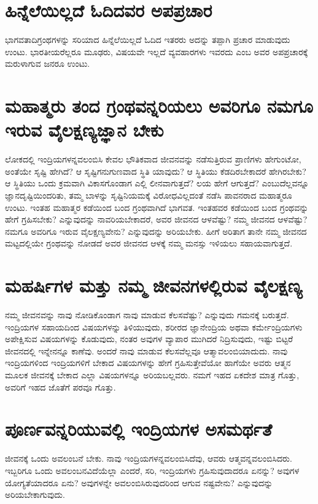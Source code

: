 \section*{ಹಿನ್ನೆಲೆಯಿಲ್ಲದೆ ಓದಿದವರ ಅಪಪ್ರಚಾರ}

ಭಾಗವತಾದಿಗ್ರಂಥಗಳನ್ನು ಸರಿಯಾದ ಹಿನ್ನೆಲೆಯಿಲ್ಲದೆ ಓದಿದ ಇತರರು ಅದನ್ನು ತಪ್ಪಾಗಿ ಪ್ರಚಾರ ಮಾಡುವುದು ಉಂಟು. ಭಾರತೀಯರೆಲ್ಲರೂ ಮೂಢರು, ವಿಷಯವೇ ಇಲ್ಲದೆ ವ್ಯವಹಾರಗಳು ಇವರದು ಎಂಬ ಅವರ ಅಪಪ್ರಚಾರಕ್ಕೆ ಮರುಳಾಗುವ ಜನರೂ ಉಂಟು.

\section*{ಮಹಾತ್ಮರು ತಂದ ಗ್ರಂಥವನ್ನರಿಯಲು ಅವರಿಗೂ ನಮಗೂ ಇರುವ ವೈಲಕ್ಷಣ್ಯಜ್ಞಾನ ಬೇಕು}

ಲೋಕದಲ್ಲಿ ಇಂದ್ರಿಯಗಳನ್ನವಲಂಬಿಸಿ ಕೇವಲ ಭೌತಿಕವಾದ ಜೀವನವನ್ನು ನಡೆಸುತ್ತಿರುವ ಪ್ರಾಣಿಗಳು ಹೇಗುಂಟೋ, ಅಂತೆಯೇ ಸೃಷ್ಟಿ ಹೇಗಿದೆ? ಆ ಸೃಷ್ಟಿಗನುಗುಣವಾದ ಸ್ಥಿತಿ ಯಾವುದು? ಆ ಸ್ಥಿತಿಯು ಕೆಡದಿರಬೇಕಾದರೆ ಹೇಗಿರಬೇಕು? ಆ ಸ್ಥಿತಿಯು ಒಂದು ಕ್ರಮವಾಗಿ ವಿಕಾಸಗೊಂಡಾಗ ಎಲ್ಲಿ ಲೀನವಾಗುತ್ತದೆ? ಲಯ ಹೇಗೆ ಆಗುತ್ತದೆ? ಎಂಬುದೆಲ್ಲವನ್ನೂ ಜ್ಞಾನದೃಷ್ಟಿಯಿಂದರಿತು, ತಮ್ಮ ಬಾಳನ್ನು ಸೃಷ್ಟಿನಿಯಮಕ್ಕೆ ವಿರೋಧವಿಲ್ಲದಂತೆ ನಡೆಸಿ ಪಾವನರಾದ ಮಹಾತ್ಮರೂ ಉಂಟು. ಇಂತಹ ಮಹಾತ್ಮರ ಕಡೆಯಿಂದ ಬಂದ ಗ್ರಂಥವಾಗಿದೆ ಭಾಗವತ. ಇಂತಹವರ ಕಡೆಯಿಂದ ಬಂದ ಗ್ರಂಥವನ್ನು ಹೇಗೆ ಗ್ರಹಿಸಬೇಕು? ಎನ್ನುವುದನ್ನು ನಾವರಿಯಬೇಕಾದರೆ, ಅವರ ಜೀವನದ ಆಳವೆಷ್ಟು? ನಮ್ಮ ಜೀವನದ ಆಳವೆಷ್ಟು? ನಮಗೂ ಅವರಿಗೂ ಇರುವ ವೈಲಕ್ಷಣ್ಯವೇನು? ಎನ್ನುವುದನ್ನು ಅರಿಯಬೇಕು. ಹೀಗೆ ಅರಿತಾಗ ತಾನೇ ನಮ್ಮ ಜೀವನದ ಮಟ್ಟದಲ್ಲಿಯೇ ಗ್ರಂಥವನ್ನು ನೋಡದೆ ಅವರ ಜೀವನದ ಆಳಕ್ಕೆ ನಮ್ಮ ಮನಸ್ಸು ಇಳಿಯಲು ಸಹಾಯವಾಗುತ್ತದೆ. 

\section*{ಮಹರ್ಷಿಗಳ ಮತ್ತು ನಮ್ಮ ಜೀವನಗಳಲ್ಲಿರುವ ವೈಲಕ್ಷಣ್ಯ }

ನಮ್ಮ ಜೀವನವನ್ನು ನಾವು ನೋಡಿಕೊಂಡಾಗ ನಾವು ಮಾಡುವ ಕೆಲಸವೆಷ್ಟು? ಎನ್ನುವುದು ಗಮನಕ್ಕೆ  ಬರುತ್ತದೆ. ಇಂದ್ರಿಯಗಳ ಸಹಾಯದಿಂದ ವಿಷಯಗಳನ್ನು ತಿಳಿಯುವುದು, ಶರೀರದ ಜ್ಞಾನೇಂದ್ರಿಯ ಅಥವಾ ಕರ್ಮೇಂದ್ರಿಯಗಳು ಅಪೇಕ್ಷಿಸುವ ವಿಷಯಗಳನ್ನು ಕೊಡುವುದು, ನಂತರ ಅವುಗಳ ವ್ಯಾಪಾರ ಮುಗಿದರೆ ನಿದ್ರಿಸುವುದು, ಇಷ್ಟು ಬಿಟ್ಟರೆ ಜೀವನದಲ್ಲಿ ಇನ್ನೇನನ್ನೂ ಕಾಣೆವು. ಅಂದರೆ ನಾವು ಮಾಡುವ ಕೆಲಸವೆಲ್ಲವೂ ಆತ್ಮಾವಲಂಬಿಯಾದುದು. ನಾವು ಇಂದ್ರಿಯಗಳಿಂದ ಇಂದ್ರಿಯಗಳಿಗೆ ಬೇಕಾದ ವಿಷಯಗಳನ್ನು ಹೇಗೆ ಗ್ರಹಿಸುತ್ತೇವೆಯೋ ಹಾಗೆಯೇ ಅವರು ಆತ್ಮನ ಮೂಲಕ ಜೀವನಕ್ಕೆ ಬೇಕಾದ ಎಲ್ಲಾ ವಿಷಯಗಳನ್ನೂ ಅರಿಯಬಲ್ಲವರು. ನಮಗೆ ಇಹದ ಏಕದೇಶ ಮಾತ್ರ ಗೊತ್ತು, ಅವರಿಗೆ ಇಹದ ಜೊತೆಗೆ ಪರವೂ ಗೊತ್ತು. 

\section*{ಪೂರ್ಣವನ್ನರಿಯುವಲ್ಲಿ ಇಂದ್ರಿಯಗಳ ಅಸಮರ್ಥತೆ}

ಜೀವನಕ್ಕೆ ಒಂದು ಅವಲಂಬನೆ ಬೇಕು. ನಾವು ಇಂದ್ರಿಯಗಳನ್ನವಲಂಬಿಸಿದೆವು, ಆವರು ಆತ್ಮವನ್ನವಲಂಬಿಸಿದರು. ಇಬ್ಬರಿಗೂ ಒಂದು ಅವಲಂಬನವಿದೆಯೆಲ್ಲಾ ಎಂದರೆ, ಸರಿ, ಇಂದ್ರಿಯಗಳು ಗ್ರಹಿಸುವುದಾದರೂ ಏನನ್ನು? ಅವುಗಳ ಯೋಗ್ಯತೆಯಾದರೂ ಏನು? ಅವುಗಳನ್ನೇ ಅವಲಂಬಿಸಿರುವುದರಿಂದ ಆಗುವ ನಷ್ಟವೇನು? ಎನ್ನುವುದನ್ನು ಅರಿಯಬೇಕಾಗುವುದು.

